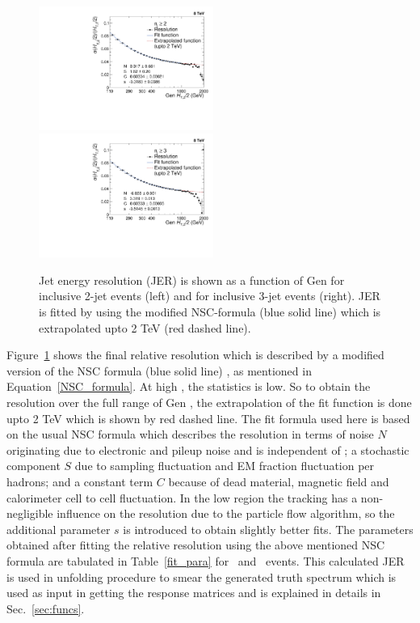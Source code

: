 \begin{figure}[!htbp]
 \begin{center}
 \includegraphics[width=0.51\textwidth]{Plots_HT_2_150/Extrapolate_Sigma_Value_Res_2_crystal_range.pdf}%
 ~~\includegraphics[width=0.51\textwidth]{Plots_HT_2_150/Extrapolate_Sigma_Value_Res_3_crystal.pdf}
 \caption{Jet energy resolution (JER) is shown as a function of Gen \httwo for inclusive 2-jet events (left) and for inclusive 3-jet events (right). JER is fitted by using the modified NSC-formula (blue solid line) which is extrapolated upto 2 TeV (red dashed line).}
    \label{fig:resolution}
  \end{center}
\end{figure}
 
Figure~\ref{fig:resolution} shows the final relative resolution which is described by a modified version of the NSC formula (blue solid line) \cite{CMS:2011esa}, as mentioned in Equation~\ref{NSC_formula}. At high \httwo, the statistics is low. So to obtain the resolution over the full range of Gen \httwons, the extrapolation of the fit function is done upto 2 TeV which is shown by red dashed line. The fit formula used here is based on the usual NSC formula which describes the resolution in terms of noise $N$ originating due to electronic and pileup noise and is independent of \httwons; a stochastic component $S$ due to sampling fluctuation and EM fraction fluctuation per hadrons; and a constant term $C$ because of dead material, magnetic field and calorimeter cell to cell fluctuation. In the low \httwo region the tracking has a non-negligible influence on the resolution due to the particle flow algorithm, so the additional parameter $s$ is introduced to obtain slightly better fits. The parameters obtained after fitting the relative resolution using the above mentioned NSC formula are tabulated in Table~\ref{fit_para} for \njt~and \njth~events. This calculated JER is used in unfolding procedure to smear the generated truth spectrum which is used as input in getting the response matrices and is explained in details in Sec.~\ref{sec:funcs}.

